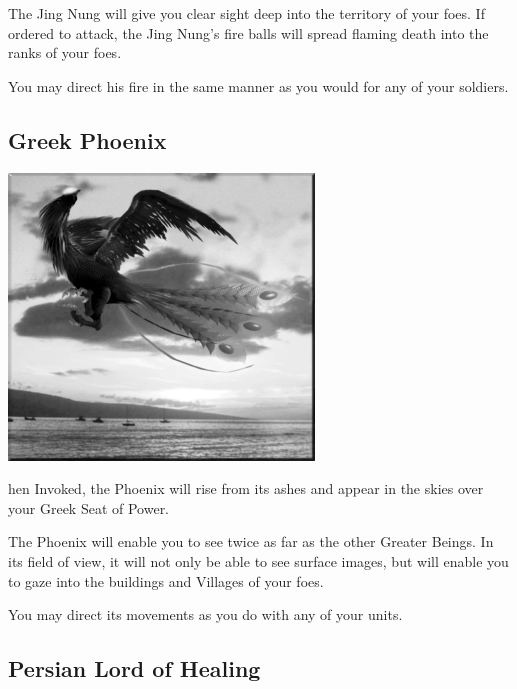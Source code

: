 The Jing Nung will give you clear sight deep into the territory of your foes. If ordered to attack, the Jing Nung’s fire balls will spread flaming death into the ranks of your foes.

You may direct his fire in the same manner as you would for any of your soldiers.

\subsection{Greek Phoenix}


\begin{center}
	\includegraphics[width=.9\linewidth]{Aphoenix}
\end{center}

hen Invoked, the Phoenix will rise from its ashes and appear in the skies over your Greek Seat of Power.

The Phoenix will enable you to see twice as far as the other Greater Beings. In its field of view, it will not only be able to see surface images, but will enable you to gaze into the buildings and Villages of your foes.

You may direct its movements as you do with any of your units.

\subsection{Persian Lord of Healing}

